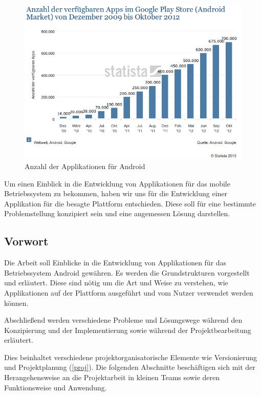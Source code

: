 \begin{figure}[h!t]
\begin{center}
\includegraphics[scale=0.6]{images/androidmarket}
\caption{Anzahl der Applikationen für Android}
\label{androidmarket}
\end{center}
\end{figure}

Um einen Einblick in die Entwicklung von Applikationen für das mobile Betriebssystem zu bekommen, haben wir uns für die Entwicklung einer Applikation für die besagte Plattform entschieden. Diese soll für eine bestimmte Problemstellung konzipiert sein und eine angemessen Lösung darstellen.

\subsection{Vorwort}

Die Arbeit soll Einblicke in die Entwicklung von Applikationen für das Betriebssystem Android gewähren. Es werden die Grundstrukturen vorgestellt und erläutert. Diese sind nötig um die Art und Weise zu verstehen, wie Applikationen auf der Plattform ausgeführt und vom Nutzer verwendet werden können.

Abschließend werden verschiedene Probleme und Lösungswege während den Konzipierung und der Implementierung sowie während der Projektbearbeitung erläutert.

Dies beinhaltet verschiedene projektorganisatorische Elemente wie Versionierung und Projektplanung (\ref{proj}). Die folgenden Abschnitte beschäftigen sich mit der Herangehensweise an die Projektarbeit in kleinen Teams sowie deren Funktionsweise und Anwendung.

